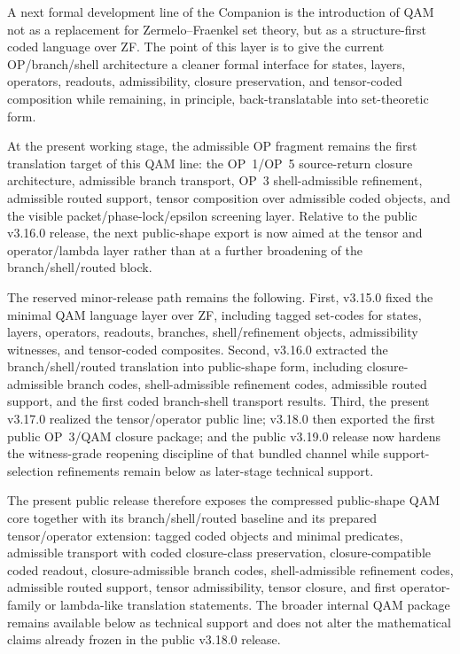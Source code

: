 \begin{remark}
A next formal development line of the Companion is the introduction of QAM not as a replacement for Zermelo--Fraenkel set theory, but as a structure-first coded language over ZF. The point of this layer is to give the current OP/branch/shell architecture a cleaner formal interface for states, layers, operators, readouts, admissibility, closure preservation, and tensor-coded composition while remaining, in principle, back-translatable into set-theoretic form.

At the present working stage, the admissible OP fragment remains the first translation target of this QAM line: the OP~1/OP~5 source-return closure architecture, admissible branch transport, OP~3 shell-admissible refinement, admissible routed support, tensor composition over admissible coded objects, and the visible packet/phase-lock/epsilon screening layer. Relative to the public v3.16.0 release, the next public-shape export is now aimed at the tensor and operator/lambda layer rather than at a further broadening of the branch/shell/routed block.

The reserved minor-release path remains the following. First, v3.15.0 fixed the minimal QAM language layer over ZF, including tagged set-codes for states, layers, operators, readouts, branches, shell/refinement objects, admissibility witnesses, and tensor-coded composites. Second, v3.16.0 extracted the branch/shell/routed translation into public-shape form, including closure-admissible branch codes, shell-admissible refinement codes, admissible routed support, and the first coded branch-shell transport results. Third, the present v3.17.0 realized the tensor/operator public line; v3.18.0 then exported the first public OP~3/QAM closure package; and the public v3.19.0 release now hardens the witness-grade reopening discipline of that bundled channel while support-selection refinements remain below as later-stage technical support.

The present public release therefore exposes the compressed public-shape QAM core together with its branch/shell/routed baseline and its prepared tensor/operator extension: tagged coded objects and minimal predicates, admissible transport with coded closure-class preservation, closure-compatible coded readout, closure-admissible branch codes, shell-admissible refinement codes, admissible routed support, tensor admissibility, tensor closure, and first operator-family or lambda-like translation statements. The broader internal QAM package remains available below as technical support and does not alter the mathematical claims already frozen in the public v3.18.0 release.


\end{remark}
